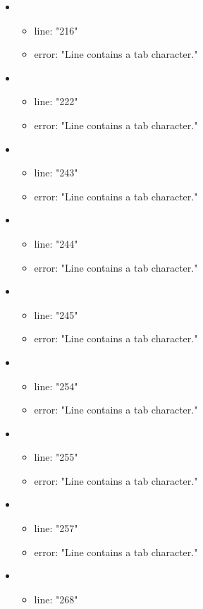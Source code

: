\begin{itemize}
	\item 
	\begin{itemize} 
		\item line: "216" 
		\item error: "Line contains a tab character." 
	\end{itemize}
	\item 
	\begin{itemize} 
		\item line: "222" 
		\item error: "Line contains a tab character." 
	\end{itemize}
	\item 
	\begin{itemize} 
		\item line: "243" 
		\item error: "Line contains a tab character." 
	\end{itemize}
	\item 
	\begin{itemize} 
		\item line: "244" 
		\item error: "Line contains a tab character." 
	\end{itemize}
	\item 
	\begin{itemize} 
		\item line: "245" 
		\item error: "Line contains a tab character." 
	\end{itemize}
	\item 
	\begin{itemize} 
		\item line: "254" 
		\item error: "Line contains a tab character." 
	\end{itemize}
	\item 
	\begin{itemize} 
		\item line: "255" 
		\item error: "Line contains a tab character." 
	\end{itemize}
	\item 
	\begin{itemize} 
		\item line: "257" 
		\item error: "Line contains a tab character." 
	\end{itemize}
	\item 
	\begin{itemize} 
		\item line: "268" 

\end{itemize}
\end{itemize}
